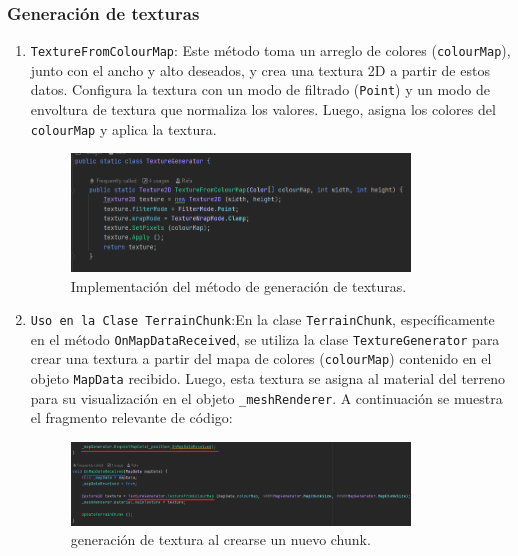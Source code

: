 \subsubsection{Generación de texturas}

\begin{enumerate}
    \item \texttt{TextureFromColourMap}: Este método toma un arreglo de colores (\texttt{colourMap}), junto con el ancho y alto deseados, y crea una textura 2D a partir de estos datos. Configura la textura con un modo de filtrado (\texttt{Point}) y un modo de envoltura de textura que normaliza los valores. Luego, asigna los colores del \texttt{colourMap} y aplica la textura.

    \begin{figure}[h]
    \centering
    \includegraphics[width=0.85\textwidth]{img/codes/TextureColor.png}
    \caption{Implementación del método de generación de texturas.}
    \end{figure}

    \item \texttt{Uso en la Clase TerrainChunk}:En la clase \texttt{TerrainChunk}, específicamente en el método \texttt{OnMapDataReceived}, se utiliza la clase \texttt{TextureGenerator} para crear una textura a partir del mapa de colores (\texttt{colourMap}) contenido en el objeto \texttt{MapData} recibido. Luego, esta textura se asigna al material del terreno para su visualización en el objeto \texttt{\_meshRenderer}. A continuación se muestra el fragmento relevante de código:
    \begin{figure}[h]
        \centering
        \includegraphics[width=0.85\textwidth]{img/codes/TexturizacionDeChunk.png}
        \caption{generación de textura al crearse un nuevo chunk.}
    \end{figure}
    
\end{enumerate}

